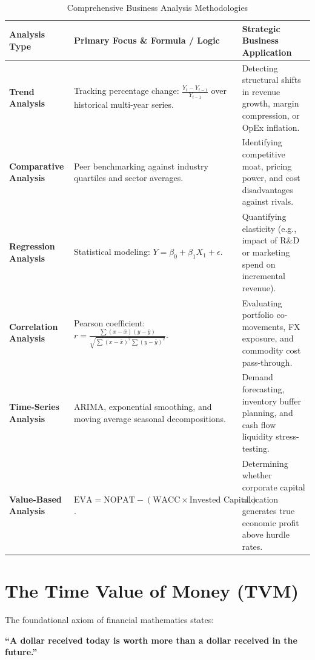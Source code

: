 \documentclass[11pt,a4paper]{article}
\begin{document}
\begin{table}[htbp]
\centering
\small
\begin{tabular}{L{3.2cm} L{4.5cm} L{6.8cm}}
\toprule
\textbf{Analysis Type} & \textbf{Primary Focus \& Formula / Logic} & \textbf{Strategic Business Application} \\
\midrule
\textbf{Trend Analysis} & Tracking percentage change: $\frac{Y_t - Y_{t-1}}{Y_{t-1}}$ over historical multi-year series. & Detecting structural shifts in revenue growth, margin compression, or OpEx inflation. \\
\addlinespace
\textbf{Comparative Analysis} & Peer benchmarking against industry quartiles and sector averages. & Identifying competitive moat, pricing power, and cost disadvantages against rivals. \\
\addlinespace
\textbf{Regression Analysis} & Statistical modeling: $Y = \beta_0 + \beta_1 X_1 + \epsilon$. & Quantifying elasticity (e.g., impact of R\&D or marketing spend on incremental revenue). \\
\addlinespace
\textbf{Correlation Analysis} & Pearson coefficient: $r = \frac{\sum (x - \bar{x})(y - \bar{y})}{\sqrt{\sum(x-\bar{x})^2 \sum(y-\bar{y})^2}}$. & Evaluating portfolio co-movements, FX exposure, and commodity cost pass-through. \\
\addlinespace
\textbf{Time-Series Analysis} & ARIMA, exponential smoothing, and moving average seasonal decompositions. & Demand forecasting, inventory buffer planning, and cash flow liquidity stress-testing. \\
\addlinespace
\textbf{Value-Based Analysis} & $\text{EVA} = \text{NOPAT} - (\text{WACC} \times \text{Invested Capital})$. & Determining whether corporate capital allocation generates true economic profit above hurdle rates. \\
\bottomrule
\end{tabular}
\caption{Comprehensive Business Analysis Methodologies}
\label{tab:business-analysis}
\end{table}

\section{The Time Value of Money (TVM)}
\label{sec:tvm}

The foundational axiom of financial mathematics states:
\begin{center}
\large\bfseries\color{keyblue} ``A dollar received today is worth more than a dollar received in the future.''
\end{center}
\end{document}
